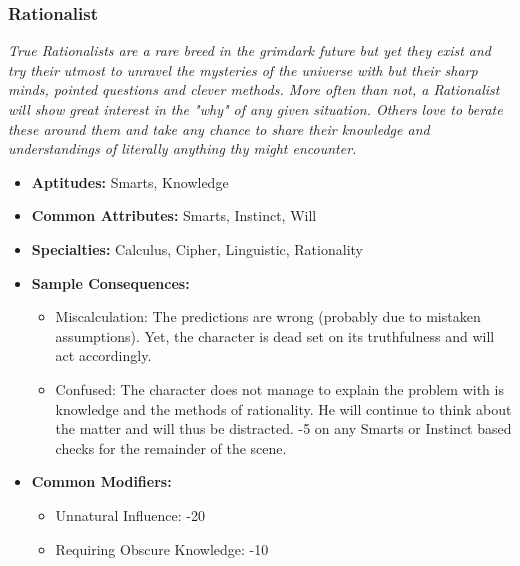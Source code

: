  \subsubsection{Rationalist}\label{Rationalist}
 \textit{True Rationalists are a rare breed in the grimdark future but yet they exist and try their utmost to unravel the mysteries of the universe with but their sharp minds, pointed questions and clever methods.
 More often than not, a Rationalist will show great interest in the "why" of any given situation.
 Others love to berate these around them and take any chance to share their knowledge and understandings of literally anything thy might encounter.}
 \begin{itemize}
 	\item \textbf{Aptitudes:} Smarts, Knowledge
 	\item \textbf{Common Attributes:} Smarts, Instinct, Will
 	\item \textbf{Specialties:} Calculus, Cipher, Linguistic, Rationality
 	\item \textbf{Sample Consequences:} 
 	\begin{itemize}
 		\item Miscalculation: The predictions are wrong (probably due to mistaken assumptions). Yet, the character is dead set on its truthfulness and will act accordingly.
 		\item Confused: The character does not manage to explain the problem with is knowledge and the methods of rationality. He will continue to think about the matter and will thus be distracted. -5 on any Smarts or Instinct based checks for the remainder of the scene.
 	\end{itemize}
 	\item \textbf{Common Modifiers:}
 	\begin{itemize}
 		\item Unnatural Influence: -20
 		\item Requiring Obscure Knowledge: -10
 	\end{itemize}
 \end{itemize}

